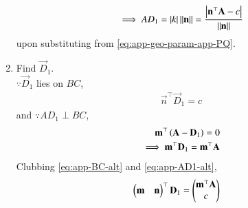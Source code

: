 \begin{enumerate}[label=\thesubsection.\arabic*.,ref=\thesubsection.\theenumi]
\begin{align}
	\implies AD_1 =\left\vert k\right\vert  
		\left\lVert\mathbf{n}\right\rVert	=
	\frac{\left\vert\mathbf{n}^{\top}\mathbf{A} - c\right\vert}{\left\lVert\mathbf{n}\right\rVert}
			\label{eq:app-PQ-final}
\end{align}
upon substituting from 
			\eqref{eq:app-geo-param-app-PQ}.
  \item Find $\vec{D}_1$.
	  \\
		\solution $\because \vec{D}_1$ lies on $BC$, 
\begin{align}
			\label{eq:app-BC-alt}
\vec{n}^\top\vec{D}_1 =c
\end{align}
and 
	$\because AD_1 \perp BC$,
\begin{align}
	\mathbf{m}^{\top}\left(\mathbf{A}-\mathbf{D}_1\right) = 0
	\\
	\implies 
	\mathbf{m}^{\top}\mathbf{D}_1 = 
	\mathbf{m}^{\top}\mathbf{A}
			\label{eq:app-AD1-alt}
\end{align}
Clubbing
			\eqref{eq:app-BC-alt}
			and 
			\eqref{eq:app-AD1-alt},
\begin{align}
			\label{eq:app-D1-alt}
	\begin{pmatrix}\mathbf{m} & \mathbf{n}\end{pmatrix}^\top\mathbf{D}_1 &= 
	   \begin{pmatrix}
              \mathbf{m}^\top\mathbf{A}\\
	      c
	      \end{pmatrix}
\end{align}
\end{enumerate}

